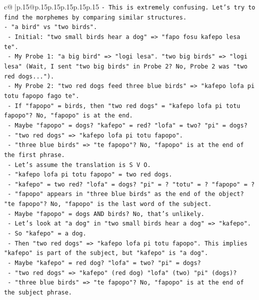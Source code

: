 \documentclass{article}
\begin{document}
{\begin{supertabular}{c@{$\;$}|p{.15\linewidth}@{}p{.15\linewidth}p{.15\linewidth}p{.15\linewidth}p{.15\linewidth}p{.15\linewidth}}
{{{\texttt{{-} This is extremely confusing. Let's try to find the morphemes by comparing similar structures.} \\
\texttt{{-} "a bird" vs "two birds".} \\
\texttt{  {-} Initial: "two small birds hear a dog" => "fapo fosu kafepo lesa te".} \\
\texttt{  {-} My Probe 1: "a big bird" => "logi lesa". "two big birds" => "logi lesa" (Wait, I sent "two big birds" in Probe 2? No, Probe 2 was "two red dogs...").} \\
\texttt{  {-} My Probe 2: "two red dogs feed three blue birds" => "kafepo lofa pi totu fapopo fago te".} \\
\texttt{  {-} If "fapopo" = birds, then "two red dogs" = "kafepo lofa pi totu fapopo"? No, "fapopo" is at the end.} \\
\texttt{  {-} Maybe "fapopo" = dogs? "kafepo" = red? "lofa" = two? "pi" = dogs?} \\
\texttt{  {-} "two red dogs" => "kafepo lofa pi totu fapopo".} \\
\texttt{  {-} "three blue birds" => "te fapopo"? No, "fapopo" is at the end of the first phrase.} \\
\texttt{  {-} Let's assume the translation is S V O.} \\
\texttt{  {-} "kafepo lofa pi totu fapopo" = two red dogs.} \\
\texttt{    {-} "kafepo" = two red? "lofa" = dogs? "pi" = ? "totu" = ? "fapopo" = ?} \\
\texttt{  {-} "fapopo" appears in "three blue birds" as the end of the object? "te fapopo"? No, "fapopo" is the last word of the subject.} \\
\texttt{  {-} Maybe "fapopo" = dogs AND birds? No, that's unlikely.} \\
\texttt{  {-} Let's look at "a dog" in "two small birds hear a dog" => "kafepo".} \\
\texttt{  {-} So "kafepo" = a dog.} \\
\texttt{  {-} Then "two red dogs" => "kafepo lofa pi totu fapopo". This implies "kafepo" is part of the subject, but "kafepo" is "a dog".} \\
\texttt{  {-} Maybe "kafepo" = red dog? "lofa" = two? "pi" = dogs?} \\
\texttt{  {-} "two red dogs" => "kafepo" (red dog) "lofa" (two) "pi" (dogs)?} \\
\texttt{  {-} "three blue birds" => "te fapopo"? No, "fapopo" is at the end of the subject phrase.} \\
}}}
\end{supertabular}}
\end{document}
